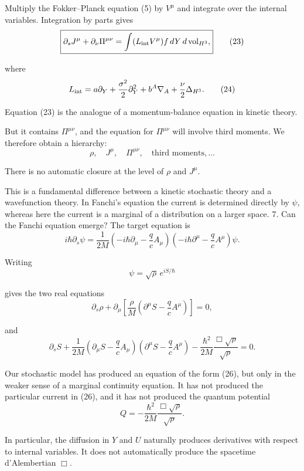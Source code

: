 Multiply the Fokker–Planck equation (5) by \(V^\mu\) and integrate over the internal variables. Integration by parts gives
\[
\boxed{
\partial_sJ^\mu+\partial_\nu\Pi^{\mu\nu}
=
\int (L_{\rm int}V^\mu)f\,
dY\,d\operatorname{vol}_{H^3},
}
\tag{23}
\]

where
\[
L_{\rm int}
=a\partial_Y+\frac{\sigma^2}{2}\partial_Y^2
+b^A\nabla_A+\frac{\nu}{2}\Delta_{H^3}.
\tag{24}
\]

Equation (23) is the analogue of a momentum-balance equation in kinetic theory.

But it contains \(\Pi^{\mu\nu}\), and the equation for \(\Pi^{\mu\nu}\) will involve third moments. We therefore obtain a hierarchy:
\[
\rho,\quad J^\mu,\quad \Pi^{\mu\nu},\quad
\text{third moments},\ldots
\]

There is no automatic closure at the level of \(\rho\) and \(J^\mu\).

This is a fundamental difference between a kinetic stochastic theory and a wavefunction theory. In Fanchi's equation the current is determined directly by \(\psi\), whereas here the current is a marginal of a distribution on a larger space.
7. Can the Fanchi equation emerge?
The target equation is
\[
i\hbar\partial_s\psi
=
\frac{1}{2M}
\left(-i\hbar\partial_\mu-\frac qc A_\mu\right)
\left(-i\hbar\partial^\mu-\frac qc A^\mu\right)\psi.
\tag{25}
\]

Writing
\[
\psi=\sqrt{\rho}\,e^{iS/\hbar}
\]

gives the two real equations
\[
\partial_s\rho+
\partial_\mu\left[
\frac{\rho}{M}
\left(\partial^\mu S-\frac qcA^\mu\right)
\right]=0,
\tag{26}
\]

and
\[
\partial_sS+
\frac{1}{2M}
\left(\partial_\mu S-\frac qcA_\mu\right)
\left(\partial^\mu S-\frac qcA^\mu\right)
-\frac{\hbar^2}{2M}
\frac{\Box\sqrt{\rho}}{\sqrt{\rho}}=0.
\tag{27}
\]

Our stochastic model has produced an equation of the form (26), but only in the weaker sense of a marginal continuity equation. It has not produced the particular current in (26), and it has not produced the quantum potential
\[
Q=-\frac{\hbar^2}{2M}\frac{\Box\sqrt{\rho}}{\sqrt{\rho}}.
\tag{28}
\]

In particular, the diffusion in \(Y\) and \(U\) naturally produces derivatives with respect to internal variables. It does not automatically produce the spacetime d'Alembertian \(\Box\).

